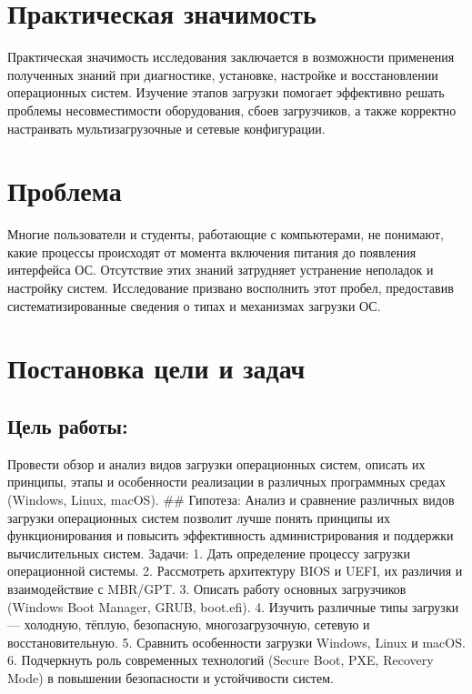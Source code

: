 \hypertarget{ux43fux440ux430ux43aux442ux438ux447ux435ux441ux43aux430ux44f-ux437ux43dux430ux447ux438ux43cux43eux441ux442ux44c}{%
\chapter{Практическая
значимость}\label{ux43fux440ux430ux43aux442ux438ux447ux435ux441ux43aux430ux44f-ux437ux43dux430ux447ux438ux43cux43eux441ux442ux44c}}

Практическая значимость исследования заключается в возможности
применения полученных знаний при диагностике, установке, настройке и
восстановлении операционных систем. Изучение этапов загрузки помогает
эффективно решать проблемы несовместимости оборудования, сбоев
загрузчиков, а также корректно настраивать мультизагрузочные и сетевые
конфигурации.

\hypertarget{ux43fux440ux43eux431ux43bux435ux43cux430}{%
\chapter{Проблема}\label{ux43fux440ux43eux431ux43bux435ux43cux430}}

Многие пользователи и студенты, работающие с компьютерами, не понимают,
какие процессы происходят от момента включения питания до появления
интерфейса ОС. Отсутствие этих знаний затрудняет устранение неполадок и
настройку систем. Исследование призвано восполнить этот пробел,
предоставив систематизированные сведения о типах и механизмах загрузки
ОС.

\hypertarget{ux43fux43eux441ux442ux430ux43dux43eux432ux43aux430-ux446ux435ux43bux438-ux438-ux437ux430ux434ux430ux447}{%
\chapter{Постановка цели и
задач}\label{ux43fux43eux441ux442ux430ux43dux43eux432ux43aux430-ux446ux435ux43bux438-ux438-ux437ux430ux434ux430ux447}}

\hypertarget{ux446ux435ux43bux44c-ux440ux430ux431ux43eux442ux44b}{%
\section{Цель
работы:}\label{ux446ux435ux43bux44c-ux440ux430ux431ux43eux442ux44b}}

Провести обзор и анализ видов загрузки операционных систем, описать их
принципы, этапы и особенности реализации в различных программных средах
(Windows, Linux, macOS). \#\# Гипотеза: Анализ и сравнение различных
видов загрузки операционных систем позволит лучше понять принципы их
функционирования и повысить эффективность администрирования и поддержки
вычислительных систем. Задачи: 1. Дать определение процессу загрузки
операционной системы. 2. Рассмотреть архитектуру BIOS и UEFI, их
различия и взаимодействие с MBR/GPT. 3. Описать работу основных
загрузчиков (Windows Boot Manager, GRUB, boot.efi). 4. Изучить различные
типы загрузки --- холодную, тёплую, безопасную, многозагрузочную,
сетевую и восстановительную. 5. Сравнить особенности загрузки Windows,
Linux и macOS. 6. Подчеркнуть роль современных технологий (Secure Boot,
PXE, Recovery Mode) в повышении безопасности и устойчивости систем.

